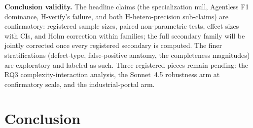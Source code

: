 \documentclass[conference]{IEEEtran}
\begin{document}
\textbf{Conclusion validity.} The headline claims (the specialization
null, Agentless F1 dominance, H-verify's failure, and both
H-hetero-precision sub-claims) are confirmatory: registered sample sizes,
paired non-parametric tests, effect sizes with CIs, and Holm correction
within families; the full secondary family will be jointly corrected once
every registered secondary is computed. The finer stratifications
(defect-type, false-positive anatomy, the completeness magnitudes) are
exploratory and labeled as such. Three registered pieces remain pending:
the RQ3 complexity-interaction analysis, the Sonnet~4.5 robustness arm at
confirmatory scale, and the industrial-portal arm.

\section{Conclusion}
\end{document}
